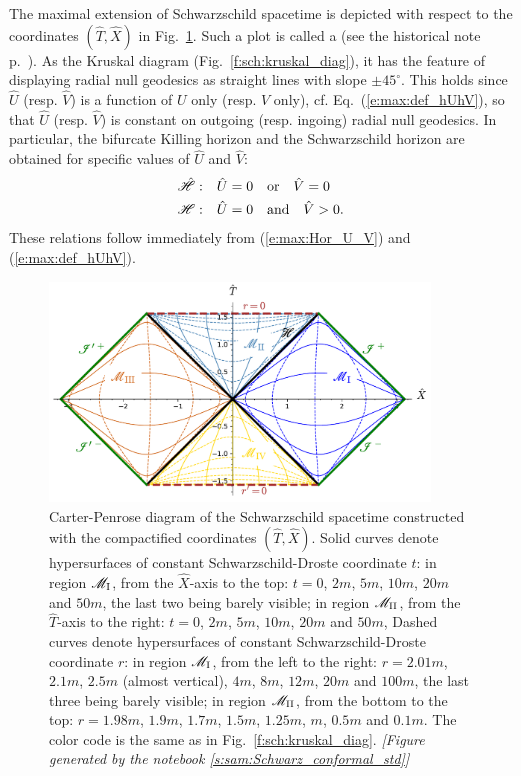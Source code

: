 The maximal extension of Schwarzschild spacetime is depicted with respect
to the coordinates $(\hat{T},\hat{X})$ in Fig.~\ref{f:max:carter-penrose-std}.
Such a plot is called a 
(see the historical note p.~\pageref{h:max:CP-diag}).
As the Kruskal diagram (Fig.~\ref{f:sch:kruskal_diag}), it has the feature
of displaying radial null geodesics as straight lines with slope $\pm 45^\circ$.
This holds
since $\hat{U}$ (resp. $\hat{V}$) is a function of $U$ only
(resp. $V$ only), cf. Eq.~(\ref{e:max:def_hUhV}), so that $\hat{U}$
(resp. $\hat{V}$) is constant on outgoing (resp. ingoing) radial null geodesics.
In particular, the bifurcate Killing horizon and the Schwarzschild horizon
are obtained for specific values of $\hat{U}$ and $\hat{V}$:
\begin{subequations}
\begin{align}
    \hat{\mathscr{H}}:\quad&  \hat{U} = 0 \quad\mbox{or}\quad \hat{V} = 0 \\
    \mathscr{H}:\quad &  \hat{U} = 0 \quad\mbox{and}\quad \hat{V} > 0 .
\end{align}
\end{subequations}
These relations follow immediately from (\ref{e:max:Hor_U_V}) and
(\ref{e:max:def_hUhV}).


\begin{figure}
\centerline{\includegraphics[width=0.9\textwidth]{max_carter-penrose-std.pdf}}
\caption[]{\label{f:max:carter-penrose-std} \footnotesize
Carter-Penrose diagram of the Schwarzschild spacetime
constructed with the compactified coordinates $(\hat{T},\hat{X})$.
Solid curves denote hypersurfaces of constant Schwarzschild-Droste coordinate
$t$: in region $\mathscr{M}_{\rm I}$, from the $\hat{X}$-axis to the top: $t=0$, $2m$,
$5m$, $10m$, $20m$ and $50m$, the last two being barely visible;
in region $\mathscr{M}_{\rm II}$, from the $\hat{T}$-axis
to the right: $t=0$, $2m$, $5m$, $10m$, $20m$ and $50m$,
Dashed curves denote hypersurfaces of constant Schwarzschild-Droste coordinate
$r$: in region $\mathscr{M}_{\rm I}$, from the left to the right: $r=2.01m$, $2.1m$, $2.5m$ (almost vertical), $4m$, $8m$, $12m$, $20m$ and $100m$, the last three being barely visible;
in region $\mathscr{M}_{\rm II}$, from the bottom to the top: $r=1.98m$, $1.9m$, $1.7m$,
$1.5m$, $1.25m$, $m$, $0.5m$ and $0.1m$.
The color code is the same as in Fig.~\ref{f:sch:kruskal_diag}.
\textsl{[Figure generated by the notebook \ref{s:sam:Schwarz_conformal_std}]}
}
\end{figure}


